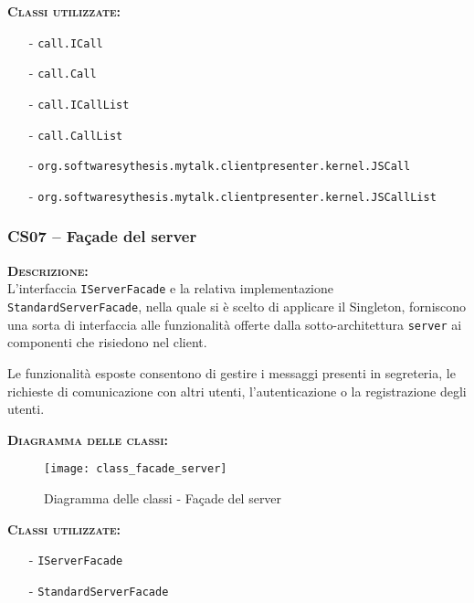 \begin{description}
  \item{\scshape\bfseries Classi utilizzate:}\\
  \begin{itemize}[noitemsep,nolistsep]
    \item[-] \texttt{call.ICall}
    \item[-] \texttt{call.Call}
    \item[-] \texttt{call.ICallList}
    \item[-] \texttt{call.CallList}
    \item[-] \texttt{org.softwaresythesis.mytalk.clientpresenter.kernel.JSCall}
    \item[-] \texttt{org.softwaresythesis.mytalk.clientpresenter.kernel.JSCallList}
  \end{itemize}
\end{description}

\subsubsection{CS07 -- Façade del server}
\begin{description}
	\item{\scshape\bfseries Descrizione:}\\
L'interfaccia \texttt{IServerFacade} e la relativa implementazione \texttt{StandardServerFacade}, nella quale si è scelto di applicare il  Singleton, forniscono una sorta di interfaccia alle funzionalità offerte dalla sotto-architettura \texttt{server} ai componenti che risiedono nel client.

Le funzionalità esposte consentono di gestire i messaggi presenti in segreteria, le richieste di comunicazione con altri utenti, l'autenticazione o  la registrazione degli utenti.
	\item{\scshape\bfseries Diagramma delle classi:}
\begin{figure}[H]
  \centering
  \texttt{[image: class\_facade\_server]}
  \caption{Diagramma delle classi - Façade del server}\label{fig:facade_server}
\end{figure}	
	
	\item{\scshape\bfseries Classi utilizzate:}\\
	\begin{itemize}[noitemsep,nolistsep]
	  \item[-] \texttt{IServerFacade}
	  \item[-] \texttt{StandardServerFacade}
	\end{itemize}
\end{description}

